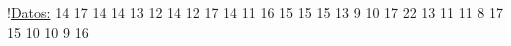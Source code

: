 \documentclass{cdplf-prueba}
\begin{document}
\begin{ejercicios}
  
  
\task!\underline{Datos:} 14 {\textbullet} 17 {\textbullet} 14 {\textbullet} 14 {\textbullet} 13 {\textbullet} 12 {\textbullet} 14 {\textbullet} 12 {\textbullet} 17 {\textbullet} 14 {\textbullet} 11 {\textbullet} 16 {\textbullet} 15 {\textbullet} 15 {\textbullet} 15 {\textbullet} 13 {\textbullet} 9 {\textbullet} 10 {\textbullet} 17 {\textbullet} 22 {\textbullet} 13 {\textbullet} 11 {\textbullet} 11 {\textbullet} 8 {\textbullet} 17 {\textbullet} 15 {\textbullet} 10 {\textbullet} 10 {\textbullet} 9 {\textbullet} 16
\vspace{10pt}
\begin{desarrollo}[height=3cm]
\end{desarrollo}
\vspace{10pt}
\respuestas
\end{ejercicios}
\end{document}
